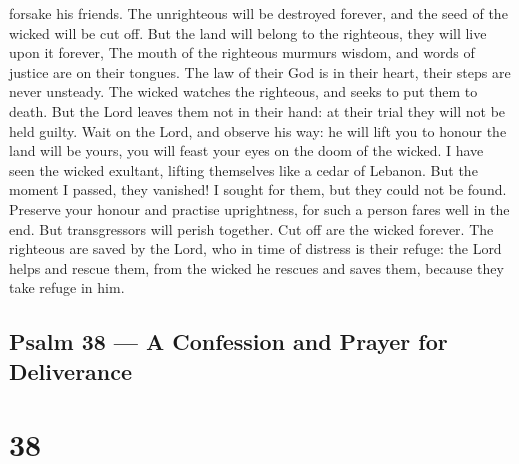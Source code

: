 forsake his friends. The unrighteous will be destroyed forever, and the
seed of the wicked will be cut off.  But the land will
belong to the righteous, they will live upon it forever, 
The mouth of the righteous murmurs wisdom, and words of justice are on
their tongues.  The law of their God is in their heart,
their steps are never unsteady.  The wicked watches the
righteous, and seeks to put them to death.  But the Lord
leaves them not in their hand: at their trial they will not be held
guilty.  Wait on the Lord, and observe his way: he will
lift you to honour the land will be yours, you will feast your eyes on
the doom of the wicked.  I have seen the wicked exultant,
lifting themselves like a cedar of Lebanon.  But the moment
I passed, they vanished! I sought for them, but they could not be found.
 Preserve your honour and practise uprightness, for such a
person fares well in the end.  But transgressors will
perish together. Cut off are the wicked forever.  The
righteous are saved by the Lord, who in time of distress is their
refuge:  the Lord helps and rescue them, from the wicked he
rescues and saves them, because they take refuge in him.

\hypertarget{psalm-38-a-confession-and-prayer-for-deliverance}{%
\subsection{Psalm 38 --- A Confession and Prayer for
Deliverance}\label{psalm-38-a-confession-and-prayer-for-deliverance}}

\hypertarget{section-37}{%
\section{38}\label{section-37}}

